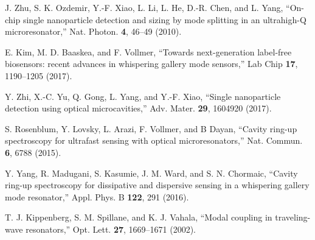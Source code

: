\documentclass[aps,onecolumn,superscriptaddress,showpacs]{revtex4}
\begin{document}
\begin{thebibliography}{99}
J. Zhu, S. K. Ozdemir, Y.-F. Xiao, L. Li, L. He, D.-R. Chen, and L. Yang, ``On-chip single nanoparticle detection and sizing
by mode splitting in an ultrahigh-Q microresonator,'' Nat. Photon. \textbf{4}, 46--49 (2010).

E. Kim, M. D. Baaskea, and F. Vollmer, ``Towards next-generation label-free biosensors: recent advances in whispering gallery mode sensors,'' Lab Chip \textbf{17}, 1190--1205 (2017).

Y. Zhi, X.-C. Yu, Q. Gong, L. Yang, and Y.-F. Xiao, ``Single nanoparticle detection using optical microcavities,'' Adv. Mater. \textbf{29}, 1604920 (2017).

S. Rosenblum, Y. Lovsky, L. Arazi, F. Vollmer, and B Dayan, ``Cavity ring-up spectroscopy for ultrafast sensing with optical microresonators,'' Nat. Commun. \textbf{6}, 6788 (2015).

Y. Yang, R. Madugani, S. Kasumie, J. M. Ward, and S. N. Chormaic, ``Cavity ring-up spectroscopy for dissipative and dispersive sensing in a whispering gallery mode resonator,''  Appl. Phys. B \textbf{122}, 291 (2016).

T. J. Kippenberg, S. M. Spillane, and K. J. Vahala, ``Modal coupling in traveling-wave resonators,'' Opt. Lett. \textbf{27}, 1669--1671 (2002).

\end{thebibliography}
\end{document}
